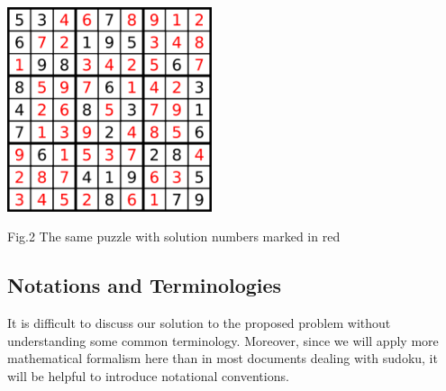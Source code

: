\documentclass{mcmthesis}
\begin{document}
\centerline{
\includegraphics[width = 6cm]{figures/sudoku_complete.png}
}
\centerline{Fig.2 The same puzzle with solution numbers marked in red}

\subsection{Notations and Terminologies}
It is difficult to discuss our solution to the proposed problem without understanding some common
terminology. Moreover, since we will apply more mathematical formalism here than in most documents dealing with sudoku, it will be helpful to introduce notational conventions.
\end{document}
